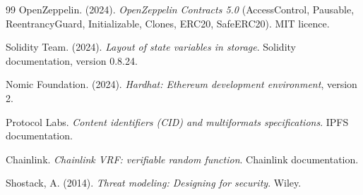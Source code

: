 \begin{thebibliography}{99}
OpenZeppelin. (2024). \emph{OpenZeppelin Contracts 5.0} (AccessControl, Pausable, ReentrancyGuard,
Initializable, Clones, ERC20, SafeERC20). MIT licence.

Solidity Team. (2024). \emph{Layout of state variables in storage}. Solidity documentation, version 0.8.24.

Nomic Foundation. (2024). \emph{Hardhat: Ethereum development environment}, version 2.

Protocol Labs. \emph{Content identifiers (CID) and multiformats specifications}. IPFS documentation.

Chainlink. \emph{Chainlink VRF: verifiable random function}. Chainlink documentation.

Shostack, A. (2014). \emph{Threat modeling: Designing for security}. Wiley.

\end{thebibliography}
\endgroup
